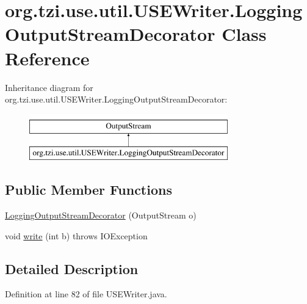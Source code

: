 \hypertarget{classorg_1_1tzi_1_1use_1_1util_1_1_u_s_e_writer_1_1_logging_output_stream_decorator}{\section{org.\-tzi.\-use.\-util.\-U\-S\-E\-Writer.\-Logging\-Output\-Stream\-Decorator Class Reference}
\label{classorg_1_1tzi_1_1use_1_1util_1_1_u_s_e_writer_1_1_logging_output_stream_decorator}
}
Inheritance diagram for org.\-tzi.\-use.\-util.\-U\-S\-E\-Writer.\-Logging\-Output\-Stream\-Decorator\-:\begin{figure}[H]
\begin{center}
\leavevmode
\includegraphics[height=2.000000cm]{classorg_1_1tzi_1_1use_1_1util_1_1_u_s_e_writer_1_1_logging_output_stream_decorator}
\end{center}
\end{figure}
\subsection*{Public Member Functions}
\begin{DoxyCompactItemize}
\item 
\hyperlink{classorg_1_1tzi_1_1use_1_1util_1_1_u_s_e_writer_1_1_logging_output_stream_decorator_a5fbae1deb91c32556d357e5eeb926938}{Logging\-Output\-Stream\-Decorator} (Output\-Stream o)
\item 
void \hyperlink{classorg_1_1tzi_1_1use_1_1util_1_1_u_s_e_writer_1_1_logging_output_stream_decorator_a6ab17413962974fd41ca4e15890636b8}{write} (int b)  throws I\-O\-Exception 
\end{DoxyCompactItemize}


\subsection{Detailed Description}


Definition at line 82 of file U\-S\-E\-Writer.\-java.



